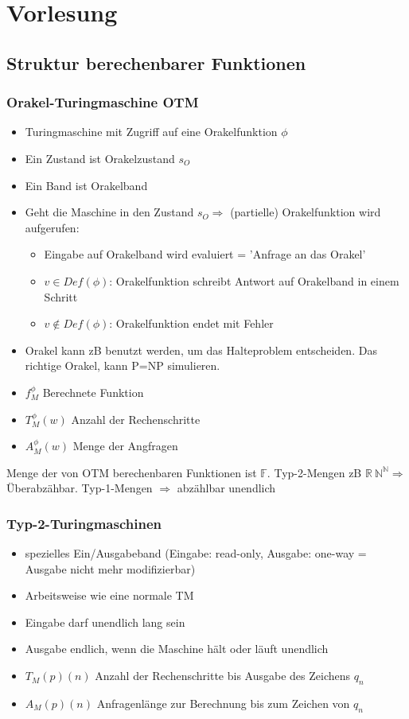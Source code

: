 \documentclass[ngerman]{scrartcl}
\begin{document}
\section{Vorlesung}
\subsection{Struktur berechenbarer Funktionen}
\subsubsection{Orakel-Turingmaschine OTM}
\begin{itemize}
  \item Turingmaschine mit Zugriff auf eine Orakelfunktion $ \phi $
  \item Ein Zustand ist Orakelzustand $ s_O $
  \item Ein Band ist Orakelband
  \item Geht die Maschine in den Zustand $ s_O \Rightarrow$ (partielle) Orakelfunktion wird aufgerufen:
  \begin{itemize}
    \item Eingabe auf Orakelband wird evaluiert = 'Anfrage an das Orakel'
    \item $ v \in Def(\phi) $: Orakelfunktion schreibt Antwort auf Orakelband in einem Schritt
    \item $ v \not\in Def(\phi) $: Orakelfunktion endet mit Fehler
  \end{itemize}
  \item Orakel kann zB benutzt werden, um das Halteproblem entscheiden. Das richtige Orakel, kann P=NP simulieren.
  \item $ f^\phi _M $ Berechnete Funktion 
  \item $ T^\phi _M(w) $ Anzahl der Rechenschritte 
  \item $ A^\phi _M(w) $ Menge der Angfragen    
\end{itemize} 
Menge der von OTM berechenbaren Funktionen ist $ \mathbb{F} $. Typ-2-Mengen zB $ \mathbb{R}\ \mathbb{N}^\mathbb{N} \Rightarrow$ Überabzähbar. Typ-1-Mengen $ \Rightarrow $ abzählbar unendlich

\subsubsection{Typ-2-Turingmaschinen}
\begin{itemize}
  \item spezielles Ein/Ausgabeband (Eingabe: read-only, Ausgabe: one-way = Ausgabe nicht mehr modifizierbar)
  \item Arbeitsweise wie eine normale TM
  \item Eingabe darf unendlich lang sein
  \item Ausgabe endlich, wenn die Maschine hält oder läuft unendlich 
  \item $ T_M(p)(n) $ Anzahl der Rechenschritte bis Ausgabe des Zeichens $ q_n $ 
  \item $ A_M(p)(n) $ Anfragenlänge zur Berechnung bis zum Zeichen von $ q_n $    
\end{itemize}
\end{document}
